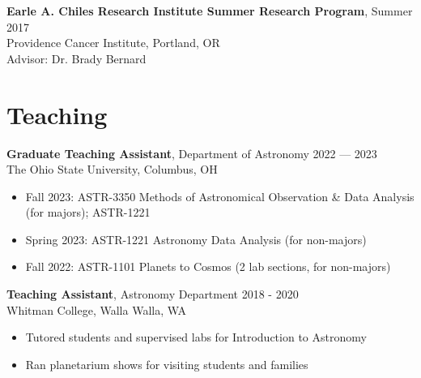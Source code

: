 \documentclass[12pt]{article}
\begin{document}
\textbf{Earle A. Chiles Research Institute Summer Research Program},
\hfill Summer 2017 \\
\hspace*{1.5em} Providence Cancer Institute, Portland, OR \\
Advisor: Dr. Brady Bernard



\section*{Teaching}

\textbf{Graduate Teaching Assistant}, Department of Astronomy \hfill 2022 --- 2023 \\
The Ohio State University, Columbus, OH
\begin{itemize}
    \item Fall 2023: ASTR-3350 Methods of Astronomical Observation \& Data Analysis (for majors); ASTR-1221
    \item Spring 2023: ASTR-1221 Astronomy Data Analysis (for non-majors)
    \item Fall 2022: ASTR-1101 Planets to Cosmos (2 lab sections, for non-majors)
\end{itemize}
\vspace{12pt}

\textbf{Teaching Assistant}, Astronomy Department \hfill 2018 - 2020 \\
Whitman College, Walla Walla, WA
\begin{itemize}
    \item Tutored students and supervised labs for Introduction to Astronomy
    \item Ran planetarium shows for visiting students and families
\end{itemize}
\vspace{12pt}
\end{document}
